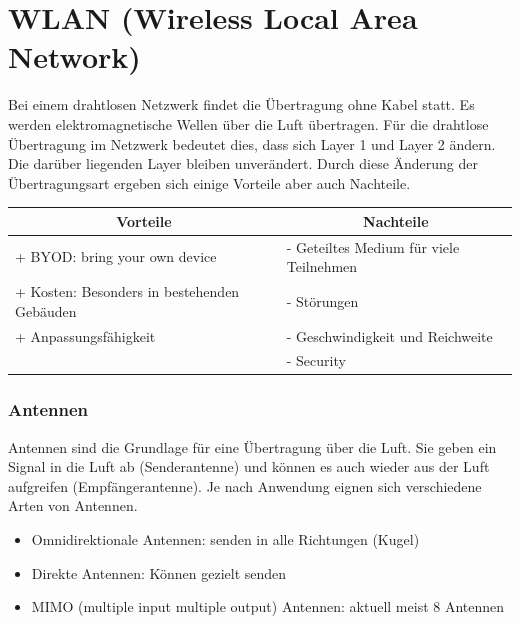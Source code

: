 \chapter{WLAN (Wireless Local Area Network)}
Bei einem drahtlosen Netzwerk findet die Übertragung ohne Kabel statt. Es werden elektromagnetische Wellen über die Luft übertragen. Für die drahtlose Übertragung im Netzwerk bedeutet dies, dass sich Layer 1 und Layer 2 ändern. Die darüber liegenden Layer bleiben unverändert. Durch diese Änderung der Übertragungsart ergeben sich einige Vorteile aber auch Nachteile.

\begin{center}
	\begin{tabular}{p{} | p{}}
		\multicolumn{1}{c|}{\textbf{Vorteile}} & \multicolumn{1}{c}{\textbf{Nachteile}} \\
		\hline
		+ BYOD: bring your own device & - Geteiltes Medium für viele Teilnehmen \\
		+ Kosten: Besonders in bestehenden Gebäuden & - Störungen \\
		+ Anpassungsfähigkeit & - Geschwindigkeit und Reichweite \\
		& - Security \\
	\end{tabular}
\end{center}

\subsection*{Antennen}
Antennen sind die Grundlage für eine Übertragung über die Luft. Sie geben ein Signal in die Luft ab (Senderantenne) und können es auch wieder aus der Luft aufgreifen (Empfängerantenne). Je nach Anwendung eignen sich verschiedene Arten von Antennen.
\begin{itemize}
	\item Omnidirektionale Antennen: senden in alle Richtungen (Kugel)
	\item Direkte Antennen: Können gezielt senden
	\item MIMO (multiple input multiple output) Antennen: aktuell meist 8 Antennen
\end{itemize}

